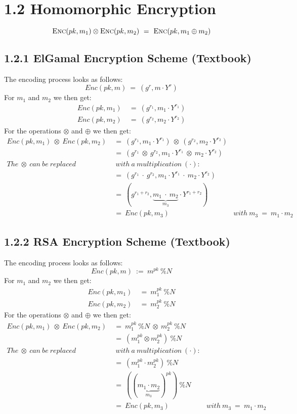 \documentclass{article}
\begin{document}
	\section*{1.2 Homomorphic Encryption}
	\begin{adjustwidth}{2em}{2em}
		\[
			\textsc{Enc}(pk, m_1) \otimes \textsc{Enc}(pk, m_2) \ = \ \textsc{Enc}(pk, m_1 \oplus m_2)
		\]
		\subsection*{1.2.1 ElGamal Encryption Scheme (Textbook)}
		The encoding process looks as follows:
		\[
			Enc(pk, m) \ = \ (g^{r}, m \cdot Y^{r})
		\]
		For $m_1$ and $m_2$ we then get:
		\begin{align*}
			Enc(pk, m_1) \ & = \ (g^{r_1}, m_1 \cdot Y^{r_1}) \\
			Enc(pk, m_2) \ & = \ (g^{r_2}, m_2 \cdot Y^{r_2})
		\end{align*}
		For the operations $\otimes$ and $\oplus$ we then get:
		\begin{align*}
			Enc(pk, m_1) \ \otimes \ Enc(pk, m_2) \ & = \ (g^{r_1}, m_1 \cdot Y^{r_1}) \ \otimes \ (g^{r_2}, m_2 \cdot Y^{r_2}) \\
			& = \ (g^{r_1} \ \otimes \ g^{r_2}, m_1 \cdot Y^{r_1} \ \otimes \ m_2 \cdot Y^{r_2}) \\
			The \ \otimes \ can \ be \ replaced &\ with \ a \ multiplication \ (\cdot): \\
			& = \ (g^{r_1} \ \cdot \ g^{r_2}, m_1 \cdot Y^{r_1} \ \cdot \ m_2 \cdot Y^{r_2}) \\
			& = \ (g^{r_1 + r_2}, \underbrace{m_1 \ \cdot \ m_2}_{m_3} \cdot Y^{r_1 + r_2}) \\
			& = \ Enc(pk, m_3) & with \ m_3 \ = \ m_1 \cdot m_2
		\end{align*}
		\subsection*{1.2.2 RSA Encryption Scheme (Textbook)}
		The encoding process looks as follows:
		\[
			Enc(pk, m) \ := \ m^{pk} \ \% N
		\]
		For $m_1$ and $m_2$ we then get:
		\begin{align*}
			Enc(pk, m_1) \ & = \ m_1^{pk} \ \% N \\
			Enc(pk, m_2) \ & = \ m_2^{pk} \ \% N
		\end{align*}
		For the operations $\otimes$ and $\oplus$ we then get:
		\begin{align*}
			Enc(pk, m_1) \ \otimes \ Enc(pk, m_2) \ & = \ m_1^{pk} \ \% N \ \otimes \ m_2^{pk} \ \% N \\
			& = \ (m_1^{pk} \otimes m_2^{pk}) \ \% N \\
			The \ \otimes \ can \ be \ replaced &\ with \ a \ multiplication \ (\cdot): \\
			& = \ (m_1^{pk} \cdot m_2^{pk}) \ \% N \\
			& = \ ((\underbrace{m_1\cdot m_2}_{m_3})^{pk}) \ \% N \\
			& = \ Enc(pk, m_3) & with \ m_3 \ = \ m_1 \cdot m_2
		\end{align*}
	\end{adjustwidth}
\end{document}

